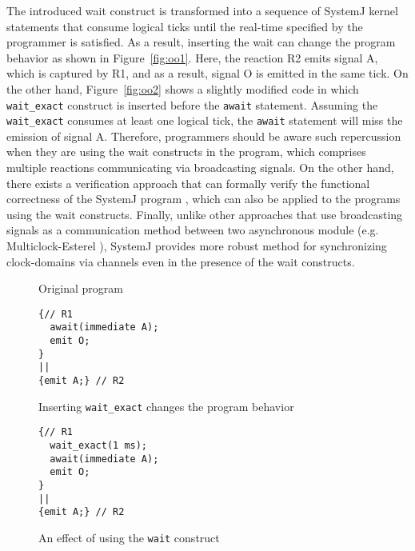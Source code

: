 The introduced wait construct is transformed into a sequence of SystemJ
kernel statements that consume logical ticks until the real-time
specified by the programmer is satisfied. As a result, inserting the
wait can change the program behavior as shown in Figure~\ref{fig:oo1}.
Here, the reaction R2 emits signal A, which is captured by R1, and as a
result, signal O is emitted in the same tick. On the other hand,
Figure~\ref{fig:oo2} shows a slightly modified code in which
\texttt{wait\_exact} construct is inserted before the \texttt{await}
statement. Assuming the \texttt{wait\_exact} consumes at least one
logical tick, the \texttt{await} statement will miss the emission of
signal A. Therefore, programmers should be aware such repercussion when
they are using the wait constructs in the program, which comprises
multiple reactions communicating via broadcasting signals. On the other
hand, there exists a verification approach that can formally verify the
functional correctness of the SystemJ program \cite{7005124}, which can
also be applied to the programs using the wait constructs. Finally,
unlike other approaches that use broadcasting signals as a communication
method between two asynchronous module (e.g.  Multiclock-Esterel
\cite{multiesterel}), SystemJ provides more robust method for
synchronizing clock-domains via channels even in the presence of the
wait constructs.



\begin{figure}[h!]
	\centering
	\vspace{-0.6cm}
	\begin{SubFloat}{\label{fig:oo1}Original program}
		\begin{minipage}[b]{0.22\textwidth}
	\begin{lstlisting}[style=sysj,basicstyle=\scriptsize\ttfamily,morekeywords={emit,trap,pause,exit,wait_exact,await,immediate,abort}]
{// R1
  await(immediate A);
  emit O;
}
|| 
{emit A;} // R2
	\end{lstlisting}
\end{minipage}
\end{SubFloat}
\begin{SubFloat}{\label{fig:oo2}Inserting \texttt{wait\_exact} changes
the program behavior}
		\begin{minipage}[b]{0.22\textwidth}
	\begin{lstlisting}[style=sysj,basicstyle=\scriptsize\ttfamily,morekeywords={emit,trap,pause,exit,wait_exact,await,immediate,abort}]
{// R1
  wait_exact(1 ms); 
  await(immediate A);
  emit O;
}
|| 
{emit A;} // R2
	\end{lstlisting}
\end{minipage}
\end{SubFloat}
\caption{An effect of using the \texttt{wait} construct}
	\label{fig:sss}
	\vspace{-0.7cm}
\end{figure}

